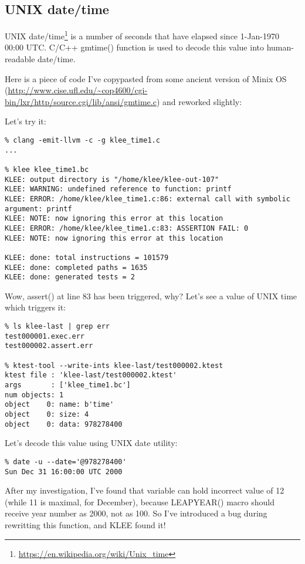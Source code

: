 \subsection{UNIX date/time}

UNIX date/time\footnote{\url{https://en.wikipedia.org/wiki/Unix_time}} is a number of seconds that have elapsed since 1-Jan-1970 00:00 UTC.
C/C++ gmtime() function is used to decode this value into human-readable date/time.

Here is a piece of code I've copypasted from some ancient version of Minix OS 
(\url{http://www.cise.ufl.edu/~cop4600/cgi-bin/lxr/http/source.cgi/lib/ansi/gmtime.c}) and reworked slightly:



Let's try it:

\begin{lstlisting}
% clang -emit-llvm -c -g klee_time1.c
...

% klee klee_time1.bc
KLEE: output directory is "/home/klee/klee-out-107"
KLEE: WARNING: undefined reference to function: printf
KLEE: ERROR: /home/klee/klee_time1.c:86: external call with symbolic argument: printf
KLEE: NOTE: now ignoring this error at this location
KLEE: ERROR: /home/klee/klee_time1.c:83: ASSERTION FAIL: 0
KLEE: NOTE: now ignoring this error at this location

KLEE: done: total instructions = 101579
KLEE: done: completed paths = 1635
KLEE: done: generated tests = 2
\end{lstlisting}

Wow, assert() at line 83 has been triggered, why?
Let's see a value of UNIX time which triggers it:

\begin{lstlisting}
% ls klee-last | grep err
test000001.exec.err
test000002.assert.err

% ktest-tool --write-ints klee-last/test000002.ktest
ktest file : 'klee-last/test000002.ktest'
args       : ['klee_time1.bc']
num objects: 1
object    0: name: b'time'
object    0: size: 4
object    0: data: 978278400
\end{lstlisting}

Let's decode this value using UNIX date utility:

\begin{lstlisting}
% date -u --date='@978278400'
Sun Dec 31 16:00:00 UTC 2000
\end{lstlisting}

After my investigation, I've found that  variable can hold incorrect value of 12 (while 11 is maximal, for December), 
because LEAPYEAR() macro should receive year number as 2000, not as 100.
So I've introduced a bug during rewritting this function, and KLEE found it!

